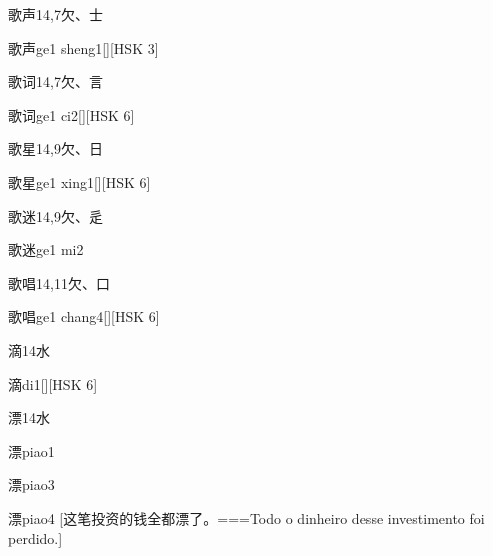 \begin{Entry}{歌声}{14,7}{⽋、⼠}
  \begin{Phonetics}{歌声}{ge1 sheng1}[][HSK 3]
  \end{Phonetics}
\end{Entry}

\begin{Entry}{歌词}{14,7}{⽋、⾔}
  \begin{Phonetics}{歌词}{ge1 ci2}[][HSK 6]
  \end{Phonetics}
\end{Entry}

\begin{Entry}{歌星}{14,9}{⽋、⽇}
  \begin{Phonetics}{歌星}{ge1 xing1}[][HSK 6]
  \end{Phonetics}
\end{Entry}

\begin{Entry}{歌迷}{14,9}{⽋、⾡}
  \begin{Phonetics}{歌迷}{ge1 mi2}
  \end{Phonetics}
\end{Entry}

\begin{Entry}{歌唱}{14,11}{⽋、⼝}
  \begin{Phonetics}{歌唱}{ge1 chang4}[][HSK 6]
  \end{Phonetics}
\end{Entry}

\begin{Entry}{滴}{14}{⽔}
  \begin{Phonetics}{滴}{di1}[][HSK 6]
  \end{Phonetics}
\end{Entry}

\begin{Entry}{漂}{14}{⽔}
  \begin{Phonetics}{漂}{piao1}
  \end{Phonetics}
  \begin{Phonetics}{漂}{piao3}
  \end{Phonetics}
  \begin{Phonetics}{漂}{piao4}
    [这笔投资的钱全都漂了。===Todo o dinheiro desse investimento foi perdido.]
  \end{Phonetics}
\end{Entry}

